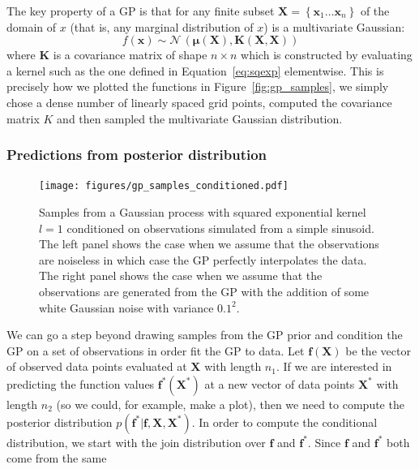 \documentclass[12pt,dvipsnames]{report}
\renewcommand{\vec}[1]{\boldsymbol{\mathbf{#1}}}
\begin{document}
The key property of a GP is that for any finite subset
$\vec{X}=\left\{\mathbf{x}_{1} \ldots \mathbf{x}_{n}\right\}$ of the domain of
$x$ (that is, any marginal distribution of $x$) is a multivariate Gaussian:
\begin{equation}
    f(\vec{x})\sim \mathcal{N}\,(\vec{\mu}(\vec{X}), \vec K(\vec{X}, \vec{X}))
\end{equation}
where $\vec K$ is a covariance matrix of shape $n\times n$ which is constructed by
evaluating  a kernel such as the one defined in Equation~\ref{eq:sqexp} elementwise.
This is precisely how we plotted
the functions in Figure~\ref{fig:gp_samples}, we simply chose a dense number of linearly
spaced grid points, computed the covariance matrix $K$ and then sampled the multivariate
Gaussian distribution.
\subsubsection{Predictions from posterior distribution}
\begin{figure}[t]
    \begin{centering}
        \texttt{[image: figures/gp\_samples\_conditioned.pdf]}
        \caption{Samples from a Gaussian process with squared exponential kernel $l=1$
            conditioned on observations simulated from a simple sinusoid.
            The left panel shows the case when we assume that
            the observations are noiseless in which case the GP perfectly interpolates the data.
            The right panel shows the case when we assume that the observations are generated
            from the GP with the addition of some white Gaussian noise with variance $0.1^2$.}
        \label{fig:gp_samples_conditioned}
    \end{centering}
\end{figure}
We can go a step beyond drawing samples from the GP prior and condition the GP
on a set of observations in order fit the GP to data. Let $\vec{f}(\vec{X})$ be
the vector of observed data points evaluated at $\vec{X}$ with length $n_1$. If
we are interested in predicting the function values $\vec{f}^*(\vec{X}^*)$ at a
new vector of data points $\vec{X}^*$ with length $n_2$ (so we could, for
example, make a plot), then we need to compute the posterior distribution
$p(\vec{f}^*\lvert \vec{f}, \vec{X},\vec{X}^*)$. In order to compute the
conditional distribution, we start with the join distribution over $\vec{f}$
and $\vec{f}^*$. Since $\vec{f}$ and $\vec{f}^*$ both come from the same
\end{document}
